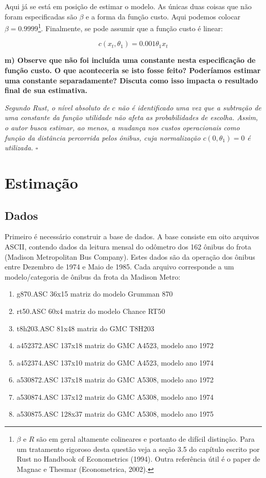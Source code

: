 \documentclass[12pt,a4paper]{article}
\providecommand{\tightlist}{%
  \setlength{\itemsep}{0pt}\setlength{\parskip}{0pt}}
\let\rmarkdownfootnote\footnote%
\def\footnote{\protect\rmarkdownfootnote}
\begin{document}
Aqui já se está em posição de estimar o modelo. As únicas duas coisas
que não foram especificadas são \(\beta\) e a forma da função custo.
Aqui podemos colocar \(\beta = 0.9999\)\footnote{\(\beta\) e \(R\) são
  em geral altamente colineares e portanto de difícil distinção. Para um
  tratamento rigoroso desta questão veja a seção 3.5 do capítulo escrito
  por Rust no Handbook of Econometrics (1994). Outra referência útil é o
  paper de Magnac e Thesmar (Econometrica, 2002).}. Finalmente, se pode
assumir que a função custo é linear:

\[
c (x_t, \theta_1) = 0.001 \theta_1 x_t
\]

\textbf{m) Observe que não foi incluída uma constante nesta
especificação de função custo. O que aconteceria se isto fosse feito?
Poderíamos estimar uma constante separadamente? Discuta como isso
impacta o resultado final de sua estimativa.}

\emph{Segundo Rust, o nível absoluto de \(c\) não é identificado uma vez
que a subtração de uma constante da função utilidade não afeta as
probabilidades de escolha. Assim, o autor busca estimar, ao menos, a
mudança nos custos operacionais como função da distância percorrida
pelos ônibus, cuja normalização \(c(0,\theta_1) = 0\) é utilizada.
\(\square\)}

\hypertarget{estimacao}{%
\section{Estimação}\label{estimacao}}

\hypertarget{dados}{%
\subsection{Dados}\label{dados}}

Primeiro é necessário construir a base de dados. A base consiste em oito
arquivos ASCII, contendo dados da leitura mensal do odômetro dos 162
ônibus do frota (Madison Metropolitan Bus Company). Estes dados são da
operação dos ônibus entre Dezembro de 1974 e Maio de 1985. Cada arquivo
corresponde a um modelo/categoria de ônibus da frota da Madison Metro:

\begin{enumerate}
\def\labelenumi{\arabic{enumi}.}
\tightlist
\item
  g870.ASC 36x15 matriz do modelo Grumman 870
\item
  rt50.ASC 60x4 matriz do modelo Chance RT50
\item
  t8h203.ASC 81x48 matriz do GMC T8H203
\item
  a452372.ASC 137x18 matriz do GMC A4523, modelo ano 1972
\item
  a452374.ASC 137x10 matriz do GMC A4523, modelo ano 1974
\item
  a530872.ASC 137x18 matriz do GMC A5308, modelo ano 1972
\item
  a530874.ASC 137x12 matriz do GMC A5308, modelo ano 1974
\item
  a530875.ASC 128x37 matriz do GMC A5308, modelo ano 1975
\end{enumerate}
\end{document}

